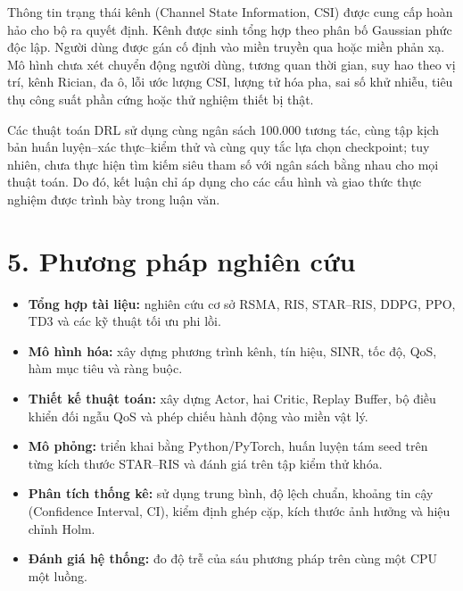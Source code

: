 Thông tin trạng thái kênh (Channel State Information, CSI) được cung cấp hoàn hảo cho bộ ra quyết định. Kênh được sinh tổng hợp theo phân bố Gaussian phức độc lập. Người dùng được gán cố định vào miền truyền qua hoặc miền phản xạ. Mô hình chưa xét chuyển động người dùng, tương quan thời gian, suy hao theo vị trí, kênh Rician, đa ô, lỗi ước lượng CSI, lượng tử hóa pha, sai số khử nhiễu, tiêu thụ công suất phần cứng hoặc thử nghiệm thiết bị thật.

Các thuật toán DRL sử dụng cùng ngân sách 100.000 tương tác, cùng tập kịch bản huấn luyện--xác thực--kiểm thử và cùng quy tắc lựa chọn checkpoint; tuy nhiên, chưa thực hiện tìm kiếm siêu tham số với ngân sách bằng nhau cho mọi thuật toán. Do đó, kết luận chỉ áp dụng cho các cấu hình và giao thức thực nghiệm được trình bày trong luận văn.

\section*{5. Phương pháp nghiên cứu}
\begin{itemize}
  \item \textbf{Tổng hợp tài liệu:} nghiên cứu cơ sở RSMA, RIS, STAR--RIS, DDPG, PPO, TD3 và các kỹ thuật tối ưu phi lồi.
  \item \textbf{Mô hình hóa:} xây dựng phương trình kênh, tín hiệu, SINR, tốc độ, QoS, hàm mục tiêu và ràng buộc.
  \item \textbf{Thiết kế thuật toán:} xây dựng Actor, hai Critic, Replay Buffer, bộ điều khiển đối ngẫu QoS và phép chiếu hành động vào miền vật lý.
  \item \textbf{Mô phỏng:} triển khai bằng Python/PyTorch, huấn luyện tám seed trên từng kích thước STAR--RIS và đánh giá trên tập kiểm thử khóa.
  \item \textbf{Phân tích thống kê:} sử dụng trung bình, độ lệch chuẩn, khoảng tin cậy (Confidence Interval, CI), kiểm định ghép cặp, kích thước ảnh hưởng và hiệu chỉnh Holm.
  \item \textbf{Đánh giá hệ thống:} đo độ trễ của sáu phương pháp trên cùng một CPU một luồng.
\end{itemize}

